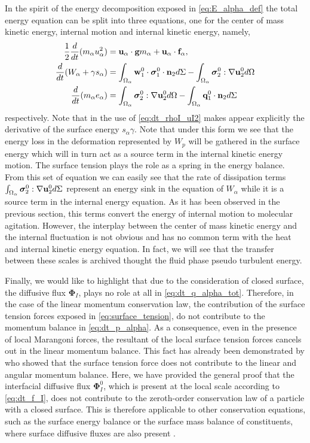 In the spirit of the energy decomposition exposed in \ref{eq:E_alpha_def} the total energy equation can be split into three equations, one for the center of mass kinetic energy, internal motion and internal kinetic energy, namely,  
\begin{align}
    \label{eq:dt_u2_alpha}
    \frac{1}{2}\frac{d}{d t} (m_\alpha u_\alpha^2)
    &= 
    \textbf{u}_\alpha\cdot
    \textbf{g}m_\alpha
    + 
    \textbf{u}_\alpha\cdot
    \textbf{f}_\alpha,\\
    \label{eq:dt_w2_alpha}
    \frac{d}{d t} (W_\alpha + \gamma s_\alpha)
    &= 
    \int_{\Omega_\alpha} \textbf{w}_1^0 \cdot \bm{\sigma}_1^0 \cdot \textbf{n}_2  d\Sigma
    - \int_{\Omega_\alpha}  \bm{\sigma}_2^0 : \mathbf{\nabla}\textbf{u}_2^0  d\Omega
    \\
     \label{eq:dt_e_alpha}
    \frac{d}{d t} (m_\alpha e_\alpha )
    &= 
     \int_{\Omega_\alpha}  \bm{\sigma}_2^0 : \mathbf{\nabla}\textbf{u}_2^0   d\Omega
    -  \int_{\Omega_\alpha} \textbf{q}_1^0\cdot \textbf{n}_2  d\Sigma 
\end{align}
respectively. 
Note that in \citet{eq:dt_w2_alpha} the use of \ref{eq:dt_rhoI_uI2} makes appear explicitly the derivative of the surface energy $s_\alpha \gamma$. 
Note that under this form we see that the energy loss in the deformation represented by $W_p$ will be gathered in the surface energy which will in turn act as a source term in the internal kinetic energy motion.
The surface tension plays the role as a spring in the energy balance.   
From this set of equation we can easily see that the rate of dissipation terms $\int_{\Omega_\alpha} \bm{\sigma}_2^0 : \mathbf{\nabla}\textbf{u}_2^0 d\Sigma$ represent an energy sink in the equation of $W_\alpha$ while it is a source term in the internal energy equation. 
As it has been observed in the previous section, this terms convert the energy of internal motion to molecular agitation. 
However, the interplay between the center of mass  kinetic energy and the internal fluctuation is not obvious and has no common term with the heat and internal kinetic energy equation.
In fact, we will see that the transfer between these scales is archived thought the fluid phase pseudo turbulent energy. 


Finally, we would like to highlight that  due to the consideration of closed surface, the diffusive flux $\mathbf{\Phi}_I$, plays no role at all in \ref{eq:dt_q_alpha_tot}.
Therefore, in the case of the linear momentum conservation law, the contribution of the surface tension forces exposed in \ref{eq:surface_tension}, do not contribute to the momentum balance in \ref{eq:dt_p_alpha}.
As a consequence, even in the presence of local Marangoni forces, the resultant of the local surface tension forces cancels out in the linear momentum balance.
This fact has already been demonstrated by \citet{hesla1993note} who showed that the surface tension force does not contribute to the linear and angular momentum balance. 
Here, we have provided the general proof that the interfacial diffusive flux $\mathbf{\Phi}_I^0$, which is present at the local scale according to \ref{eq:dt_f_I}, does not contribute to the zeroth-order conservation law of a particle with a closed surface.
This is therefore applicable to other conservation equations, such as the surface energy balance or the surface mass balance of constituents, where surface diffusive fluxes are also present \citep{bothe2022sharp,manikantan2020surfactant}. 

